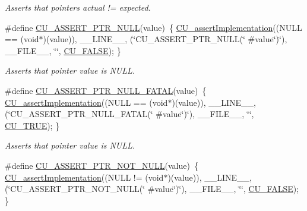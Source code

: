 \begin{DoxyCompactItemize}
\begin{DoxyCompactList}\small\item\em Asserts that pointers actual != expected. \end{DoxyCompactList}\item 
\#define \hyperlink{group___framework_ga4b8a3f1011635ac3596c13714e1fb03b}{C\+U\+\_\+\+A\+S\+S\+E\+R\+T\+\_\+\+P\+T\+R\+\_\+\+N\+U\+L\+L}(value)~\{ \hyperlink{group___framework_gad409fc536d9d3fb5f659c76421e8ce3b}{C\+U\+\_\+assert\+Implementation}((N\+U\+L\+L == (void$\ast$)(value)), \+\_\+\+\_\+\+L\+I\+N\+E\+\_\+\+\_\+, (\char`\"{}C\+U\+\_\+\+A\+S\+S\+E\+R\+T\+\_\+\+P\+T\+R\+\_\+\+N\+U\+L\+L(\char`\"{} \#value\char`\"{})\char`\"{}), \+\_\+\+\_\+\+F\+I\+L\+E\+\_\+\+\_\+, \char`\"{}\char`\"{}, \hyperlink{group___framework_ga7453214541b156ef868681eaafe60860}{C\+U\+\_\+\+F\+A\+L\+S\+E}); \}
\begin{DoxyCompactList}\small\item\em Asserts that pointer value is N\+U\+L\+L. \end{DoxyCompactList}\item 
\#define \hyperlink{group___framework_ga6078f8d91d417f24b338819408985da1}{C\+U\+\_\+\+A\+S\+S\+E\+R\+T\+\_\+\+P\+T\+R\+\_\+\+N\+U\+L\+L\+\_\+\+F\+A\+T\+A\+L}(value)~\{ \hyperlink{group___framework_gad409fc536d9d3fb5f659c76421e8ce3b}{C\+U\+\_\+assert\+Implementation}((N\+U\+L\+L == (void$\ast$)(value)), \+\_\+\+\_\+\+L\+I\+N\+E\+\_\+\+\_\+, (\char`\"{}C\+U\+\_\+\+A\+S\+S\+E\+R\+T\+\_\+\+P\+T\+R\+\_\+\+N\+U\+L\+L\+\_\+\+F\+A\+T\+A\+L(\char`\"{} \#value\char`\"{})\char`\"{}), \+\_\+\+\_\+\+F\+I\+L\+E\+\_\+\+\_\+, \char`\"{}\char`\"{}, \hyperlink{group___framework_ga99641394bc766ca9c4a295e942fed1ef}{C\+U\+\_\+\+T\+R\+U\+E}); \}
\begin{DoxyCompactList}\small\item\em Asserts that pointer value is N\+U\+L\+L. \end{DoxyCompactList}\item 
\#define \hyperlink{group___framework_gac5319ca4cf950f8c0c3a689d17e46212}{C\+U\+\_\+\+A\+S\+S\+E\+R\+T\+\_\+\+P\+T\+R\+\_\+\+N\+O\+T\+\_\+\+N\+U\+L\+L}(value)~\{ \hyperlink{group___framework_gad409fc536d9d3fb5f659c76421e8ce3b}{C\+U\+\_\+assert\+Implementation}((N\+U\+L\+L != (void$\ast$)(value)), \+\_\+\+\_\+\+L\+I\+N\+E\+\_\+\+\_\+, (\char`\"{}C\+U\+\_\+\+A\+S\+S\+E\+R\+T\+\_\+\+P\+T\+R\+\_\+\+N\+O\+T\+\_\+\+N\+U\+L\+L(\char`\"{} \#value\char`\"{})\char`\"{}), \+\_\+\+\_\+\+F\+I\+L\+E\+\_\+\+\_\+, \char`\"{}\char`\"{}, \hyperlink{group___framework_ga7453214541b156ef868681eaafe60860}{C\+U\+\_\+\+F\+A\+L\+S\+E}); \}

\end{DoxyCompactItemize}
